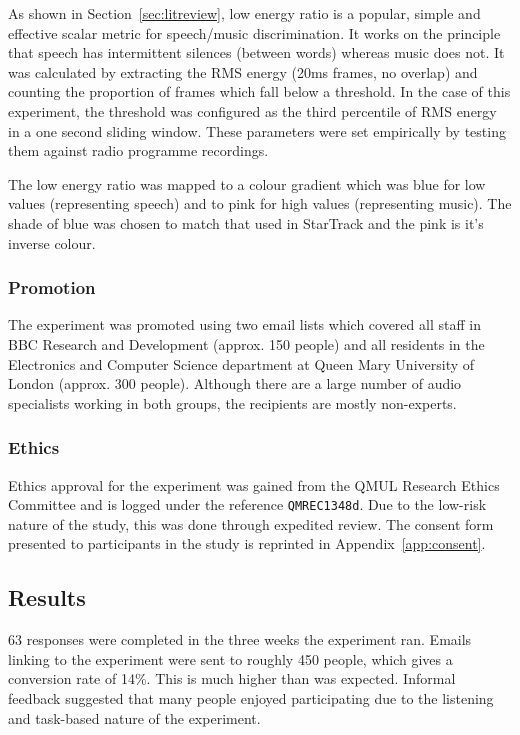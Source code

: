 As shown in Section~\ref{sec:litreview}, low energy ratio is a popular, simple
and effective scalar metric for speech/music discrimination. It works on the
principle that speech has intermittent silences (between words) whereas music
does not. It was calculated by extracting the RMS energy (20ms frames, no
overlap) and counting the proportion of frames which fall below a threshold.
In the case of this experiment, the threshold was configured as the third
percentile of RMS energy in a one second sliding window. These parameters were
set empirically by testing them against radio programme recordings.

The low energy ratio was mapped to a colour gradient which was blue for low
values (representing speech) and to pink for high values (representing music).
The shade of blue was chosen to match that used in StarTrack and the pink is
it's inverse colour.

\subsubsection{Promotion}\label{sec:promo}
The experiment was promoted using two email lists which covered all staff in
BBC Research and Development (approx. 150 people) and all residents in the
Electronics and Computer Science department at Queen Mary University of London
(approx. 300 people). Although there are a large number of audio specialists
working in both groups, the recipients are mostly non-experts.

\subsubsection{Ethics}
Ethics approval for the experiment was gained from the QMUL Research Ethics
Committee and is logged under the reference \texttt{QMREC1348d}. Due to the
low-risk nature of the study, this was done through expedited review. The
consent form presented to participants in the study is reprinted in
Appendix~\ref{app:consent}.

\subsection{Results}
63 responses were completed in the three weeks the experiment ran. Emails
linking to the experiment were sent to roughly 450 people, which gives a
conversion rate of 14\%. This is much higher than was expected.  Informal
feedback suggested that many people enjoyed participating due to the listening
and task-based nature of the experiment. 

